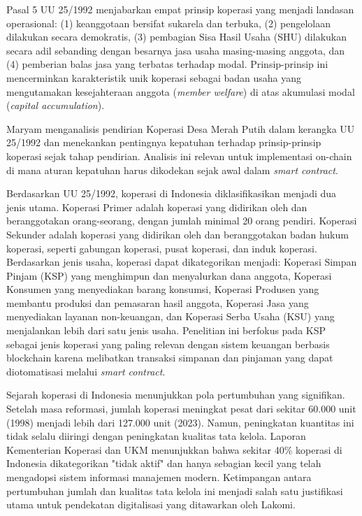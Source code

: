 Pasal 5 UU 25/1992 menjabarkan empat prinsip koperasi yang menjadi landasan operasional: (1) keanggotaan bersifat sukarela dan terbuka, (2) pengelolaan dilakukan secara demokratis, (3) pembagian Sisa Hasil Usaha (SHU) dilakukan secara adil sebanding dengan besarnya jasa usaha masing-masing anggota, dan (4) pemberian balas jasa yang terbatas terhadap modal. Prinsip-prinsip ini mencerminkan karakteristik unik koperasi sebagai badan usaha yang mengutamakan kesejahteraan anggota (\textit{member welfare}) di atas akumulasi modal (\textit{capital accumulation}).

Maryam \cite{maryam2025pendirian} menganalisis pendirian Koperasi Desa Merah Putih dalam kerangka UU 25/1992 dan menekankan pentingnya kepatuhan terhadap prinsip-prinsip koperasi sejak tahap pendirian. Analisis ini relevan untuk implementasi on-chain di mana aturan kepatuhan harus dikodekan sejak awal dalam \textit{smart contract}.

Berdasarkan UU 25/1992, koperasi di Indonesia diklasifikasikan menjadi dua jenis utama. Koperasi Primer adalah koperasi yang didirikan oleh dan beranggotakan orang-seorang, dengan jumlah minimal 20 orang pendiri. Koperasi Sekunder adalah koperasi yang didirikan oleh dan beranggotakan badan hukum koperasi, seperti gabungan koperasi, pusat koperasi, dan induk koperasi. Berdasarkan jenis usaha, koperasi dapat dikategorikan menjadi: Koperasi Simpan Pinjam (KSP) yang menghimpun dan menyalurkan dana anggota, Koperasi Konsumen yang menyediakan barang konsumsi, Koperasi Produsen yang membantu produksi dan pemasaran hasil anggota, Koperasi Jasa yang menyediakan layanan non-keuangan, dan Koperasi Serba Usaha (KSU) yang menjalankan lebih dari satu jenis usaha. Penelitian ini berfokus pada KSP sebagai jenis koperasi yang paling relevan dengan sistem keuangan berbasis blockchain karena melibatkan transaksi simpanan dan pinjaman yang dapat diotomatisasi melalui \textit{smart contract}.

Sejarah koperasi di Indonesia menunjukkan pola pertumbuhan yang signifikan. Setelah masa reformasi, jumlah koperasi meningkat pesat dari sekitar 60.000 unit (1998) menjadi lebih dari 127.000 unit (2023). Namun, peningkatan kuantitas ini tidak selalu diiringi dengan peningkatan kualitas tata kelola. Laporan Kementerian Koperasi dan UKM menunjukkan bahwa sekitar 40\% koperasi di Indonesia dikategorikan "tidak aktif" dan hanya sebagian kecil yang telah mengadopsi sistem informasi manajemen modern. Ketimpangan antara pertumbuhan jumlah dan kualitas tata kelola ini menjadi salah satu justifikasi utama untuk pendekatan digitalisasi yang ditawarkan oleh Lakomi.

